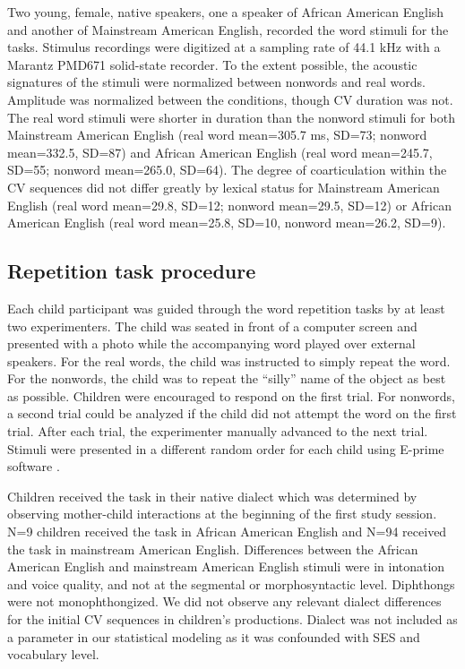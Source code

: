 \documentclass[a4paper,man,natbib,donotrepeattitle, apacite]{apa6}
\begin{document}
Two young, female, native speakers, one a speaker of African American English and another of Mainstream American English, recorded the word stimuli for the tasks. Stimulus recordings were digitized at a sampling rate of 44.1 kHz with a Marantz PMD671 solid-state recorder. To the extent possible, the acoustic signatures of the stimuli were normalized between nonwords and real words. Amplitude was normalized between the conditions, though CV duration was not. The real word stimuli were shorter in duration than the nonword stimuli for both Mainstream American English (real word mean=305.7 ms, SD=73; nonword mean=332.5, SD=87) and African American English (real word mean=245.7, SD=55; nonword mean=265.0, SD=64). The degree of coarticulation within the CV sequences did not differ greatly by lexical status for Mainstream American English (real word mean=29.8, SD=12; nonword mean=29.5, SD=12) or African American English (real word mean=25.8, SD=10, nonword mean=26.2, SD=9).   

\subsection{Repetition task procedure}

Each child participant was guided through the word repetition tasks by at least two experimenters. The child was seated in front of a computer screen and presented with a photo while the accompanying word played over external speakers. For the real words, the child was instructed to simply repeat the word. For the nonwords, the child was to repeat the ``silly'' name of the object as best as possible. Children were encouraged to respond on the first trial. For nonwords, a second trial could be analyzed if the child did not attempt the word on the first trial. After each trial, the experimenter manually advanced to the next trial. Stimuli were presented in a different random order for each child using E-prime software \cite{schneiderEPrime2012}. 

Children received the task in their native dialect which was determined by observing mother-child interactions at the beginning of the first study session. N=9 children received the task in African American English and N=94 received the task in mainstream American English. Differences between the African American English and mainstream American English stimuli were in intonation and voice quality, and not at the segmental or morphosyntactic level. Diphthongs were not monophthongized. We did not observe any relevant dialect differences for the initial CV sequences in children’s productions. Dialect was not included as a parameter in our statistical modeling as it was confounded with SES and vocabulary level.
\end{document}
